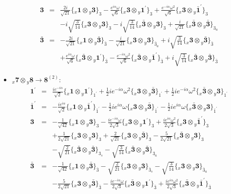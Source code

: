 \documentclass[english]{article}
\newcommand{\rep}[1]{\mathbf{#1}}
\newcommand{\repx}[2]{{}_{#2}\mathbf{#1}}
\newcommand{\subcg}[3]{\big\{ \repx{#1}{x}\otimes\repx{#2}{y}\big\}^{}_{#3}}
\begin{document}
\begin{itemize}
\begin{eqnarray*}
\rep{3} &=& \frac{2 i}{\sqrt{21}}\subcg{1}{3}{3}-\frac{e^{i \alpha } \omega }{\sqrt{6}}\subcg{3}{1^{\prime}}{3}+\frac{e^{-i \alpha } \omega ^2}{\sqrt{6}}\subcg{3}{\bar{1}^{\prime}}{3} \\ 
 & & -i \sqrt{\frac{3}{14}}\subcg{3}{3}{3}-i \sqrt{\frac{3}{14}}\subcg{\bar{3}}{3}{3}+\frac{i}{\sqrt{21}}\subcg{\bar{3}}{\bar{3}}{3_{a}}
\\
\rep{\bar{3}} &=& -\frac{2 i}{\sqrt{21}}\subcg{1}{\bar{3}}{\bar{3}}-\frac{i}{\sqrt{21}}\subcg{3}{3}{\bar{3}_{a}}+i \sqrt{\frac{3}{14}}\subcg{3}{\bar{3}}{\bar{3}} \\ 
 & & +\frac{e^{i \alpha } \omega }{\sqrt{6}}\subcg{\bar{3}}{1^{\prime}}{\bar{3}}-\frac{e^{-i \alpha } \omega ^2}{\sqrt{6}}\subcg{\bar{3}}{\bar{1}^{\prime}}{\bar{3}}+i \sqrt{\frac{3}{14}}\subcg{\bar{3}}{\bar{3}}{\bar{3}}
\end{eqnarray*}
\item $\repx{7}{x}\otimes\repx{8}{y}\to\rep{8}^{(2)}$:
\begin{eqnarray*}
\rep{1^{\prime}} &=& \frac{i e^{-i \alpha }}{\sqrt{2}}\subcg{1}{1^{\prime}}{1^{\prime}}+\frac{1}{2} i e^{-i \alpha } \omega ^2\subcg{3}{\bar{3}}{1^{\prime}}+\frac{1}{2} i e^{-i \alpha } \omega ^2\subcg{\bar{3}}{3}{1^{\prime}}
\\
\rep{\bar{1}^{\prime}} &=& -\frac{i e^{i \alpha }}{\sqrt{2}}\subcg{1}{\bar{1}^{\prime}}{\bar{1}^{\prime}}-\frac{1}{2} i e^{i \alpha } \omega\subcg{3}{\bar{3}}{\bar{1}^{\prime}}-\frac{1}{2} i e^{i \alpha } \omega\subcg{\bar{3}}{3}{\bar{1}^{\prime}}
\\
\rep{3} &=& -\frac{1}{\sqrt{42}}\subcg{1}{3}{3}-\frac{i e^{-i \alpha } \omega }{2 \sqrt{3}}\subcg{3}{1^{\prime}}{3}+\frac{i e^{i \alpha } \omega ^2}{2 \sqrt{3}}\subcg{3}{\bar{1}^{\prime}}{3} \\ 
 & & +\frac{1}{2 \sqrt{21}}\subcg{3}{3}{3}+\frac{2}{\sqrt{21}}\subcg{3}{\bar{3}}{3}-\frac{5}{2 \sqrt{21}}\subcg{\bar{3}}{3}{3} \\ 
 & & -\sqrt{\frac{2}{21}}\subcg{\bar{3}}{\bar{3}}{3_{s}}-\sqrt{\frac{3}{14}}\subcg{\bar{3}}{\bar{3}}{3_{a}}
\\
\rep{\bar{3}} &=& -\frac{1}{\sqrt{42}}\subcg{1}{\bar{3}}{\bar{3}}-\sqrt{\frac{2}{21}}\subcg{3}{3}{\bar{3}_{s}}-\sqrt{\frac{3}{14}}\subcg{3}{3}{\bar{3}_{a}} \\ 
 & & -\frac{5}{2 \sqrt{21}}\subcg{3}{\bar{3}}{\bar{3}}-\frac{i e^{-i \alpha } \omega }{2 \sqrt{3}}\subcg{\bar{3}}{1^{\prime}}{\bar{3}}+\frac{i e^{i \alpha } \omega ^2}{2 \sqrt{3}}\subcg{\bar{3}}{\bar{1}^{\prime}}{\bar{3}} \\ 

\end{eqnarray*}
\end{itemize}
\end{document}

